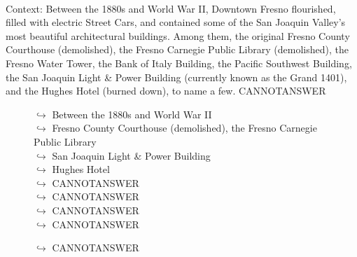 \documentclass[11pt,a4paper, onecolumn]{article}
\begin{document}
\\ Context: Between the 1880s and World War II, Downtown Fresno flourished, filled with electric Street Cars, and contained some of the San Joaquin Valley's most beautiful architectural buildings. Among them, the original Fresno County Courthouse (demolished), the Fresno Carnegie Public Library (demolished), the Fresno Water Tower, the Bank of Italy Building, the Pacific Southwest Building, the San Joaquin Light & Power Building (currently known as the Grand 1401), and the Hughes Hotel (burned down), to name a few. CANNOTANSWER

\begin{figure}[t] \small \begin{tcolorbox}[boxsep=0pt,left=5pt,right=0pt,top=2pt,colback = yellow!5] \begin{dialogue}
 \small 
\colorbox{pink!25}{$\hookrightarrow$}
{ Between the 1880s and World War II }
\\
\colorbox{pink!25}{$\hookrightarrow$}
{ Fresno County Courthouse (demolished), the Fresno Carnegie Public Library }
\\
\colorbox{pink!25}{$\hookrightarrow$}
{ San Joaquin Light & Power Building }
\\
\colorbox{pink!25}{$\hookrightarrow$}
{ Hughes Hotel }
\\
\colorbox{pink!25}{$\hookrightarrow$}
{ CANNOTANSWER }
\\
\colorbox{pink!25}{$\hookrightarrow$}
{ CANNOTANSWER }
\\
\colorbox{pink!25}{$\hookrightarrow$}
{ CANNOTANSWER }
\\
\colorbox{pink!25}{$\hookrightarrow$}
{ CANNOTANSWER }
 \end{dialogue}\end{tcolorbox}\end{figure}\begin{figure}[t] \small \begin{tcolorbox}[boxsep=0pt,left=5pt,right=0pt,top=2pt,colback = yellow!5] \begin{dialogue}
 \small 
\colorbox{pink!25}{$\hookrightarrow$}
{ CANNOTANSWER }
\\
 \end{dialogue}\end{tcolorbox}\end{figure}
\end{document}
